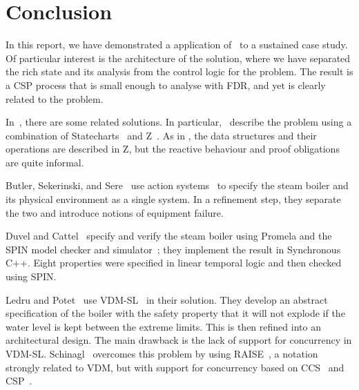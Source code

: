 \documentclass{report}
\begin{document}

\chapter{Conclusion}

In this report, we have demonstrated a application of \Circus\ to a
sustained case study.  Of particular interest is the architecture of
the solution, where we have separated the rich state and its analysis
from the control logic for the problem.  The result is a CSP process
that is small enough to analyse with FDR, and yet is clearly related
to the problem.

In~\cite{abrial-borger-langmaack-96}, there are some related
solutions.  In particular,~\cite{bussow-weber-96} describe the problem
using a combination of Statecharts~\cite{harel-87, harel-gery-96} and
Z~\cite{spivey-92, woodcock-davies-96}.  As in \Circus, the data
structures and their operations are described in Z, but the reactive
behaviour and proof obligations are quite informal.

Butler, Sekerinski, and Sere~\cite{butler-sekerinski-sere-96} use
action systems~\cite{back-kurki-suonio-83} to specify the steam boiler
and its physical environment as a single system.  In a refinement
step, they separate the two and introduce notions of equipment
failure.

Duvel and Cattel~\cite{duval-cattel-96} specify and verify the steam
boiler using Promela and the SPIN model checker and
simulator~\cite{holzmann-91, holzmann-93, holzmann-95}; they implement
the result in Synchronous C++.  Eight properties were specified in
linear temporal logic and then checked using SPIN.

Ledru and Potet~\cite{ledru-potet-96} use VDM-SL~\cite{jones-90,
  andrews-bruun-hansen-larsen-plat-95} in their solution.  They
develop an abstract specification of the boiler with the safety
property that it will not explode if the water level is kept between
the extreme limits.  This is then refined into an architectural
design.  The main drawback is the lack of support for concurrency in
VDM-SL.  Schinagl~\cite{schinagl-96} overcomes this problem by using
RAISE~\cite{raise-92}, a notation strongly related to VDM, but with
support for concurrency based on CCS~\cite{milner-89} and
CSP~\cite{hoare-85}.

\end{document}
